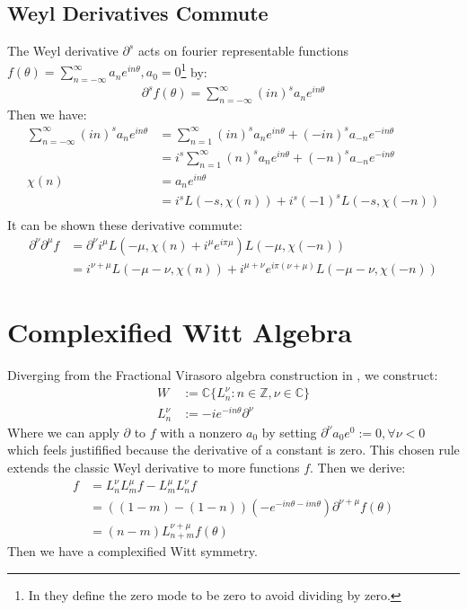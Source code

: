 \documentclass{artjlt}
\newcommand{\?}{\textbackslash}
\newcommand{\C}{\mathbb{C}}
\newcommand{\Z}{\mathbb{Z}}
\begin{document}
\subsection{Weyl Derivatives Commute}
The Weyl derivative $\partial^s$ \cite{article} acts on fourier representable functions 
$f(\theta)= \sum_{n=-\infty}^\infty a_n e^{i n \theta}, a_0 = 0$\footnote{In \cite{article} they define the zero mode to be zero to avoid dividing by zero.} by:
\begin{align*}
  \partial^s f(\theta)= \sum_{n=-\infty}^\infty (in)^s a_n e^{i n \theta}
\end{align*}
Then we have:
\begin{align*}
  \sum_{n=-\infty}^\infty (in)^s a_n e^{i n \theta} &= \sum_{n=1}^\infty (in)^s a_n e^{i n \theta} + (-in)^s a_{-n} e^{-i n \theta} \\
  &= i^s \sum_{n=1}^\infty (n)^s a_n e^{i n \theta} + (-n)^s a_{-n} e^{-i n \theta} \\
  \chi(n) &= a_n e^{i n \theta} \\
  &= i^s L(-s,\chi(n)) + i^s (-1)^s L(-s,\chi(-n)) \\
\end{align*}
It can be shown these derivative commute:
\begin{align*}
  \partial^\nu \partial^\mu f &= \partial^\nu i^\mu L(-\mu,\chi(n)+ i^\mu e^{i \pi \mu})L(-\mu,\chi(-n)) \\
  &= i^{\nu + \mu} L(-\mu-\nu,\chi(n)) + i^{\mu + \nu} e^{i \pi (\nu+\mu)} L(-\mu-\nu,\chi(-n))
\end{align*}
\section{Complexified Witt Algebra}
Diverging from the Fractional Virasoro algebra construction in \cite{La_Nave_2019}, we construct:
\begin{align*}
W &:= \C \{L^\nu_n: n \in \Z, \nu \in \C \} \\
L^\nu_n &:= -i e^{-i n \theta} \partial^\nu
\end{align*}
Where we can apply $\partial$ to $f$ with a nonzero $a_0$ by setting $\partial^\nu a_0 e^{0}:= 0, \forall \nu<0$ which feels justifified because the derivative of a constant is zero. This chosen rule extends the classic Weyl derivative to more functions $f$.  
Then we derive:
\begin{align*}
  [L^\nu_n, L^\mu_m] f &= L^\nu_n L^\mu_m f - L^\mu_m L^\nu_n f \\
  &= ((1-m)-(1-n))(- e^{-i n \theta - i m \theta}) \partial^{\nu+\mu} f(\theta) \\
  &=(n-m)L^{\nu + \mu}_{n+m} f(\theta)
\end{align*}
Then we have a complexified Witt symmetry.
\end{document}
